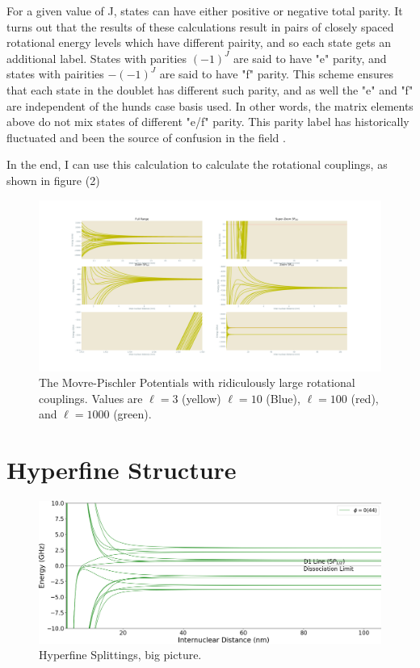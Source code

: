 \documentclass[prl, longbibliography]{revtex4-2}
\begin{document}
For a given value of J, states can have either positive or negative total parity. It turns out that the results of these calculations result in pairs of closely spaced rotational energy levels which have different pairity, and so each state gets an additional label. States with parities $(-1)^J$ are said to have "e" parity, and states with pairities $-(-1)^J$ are said to have "f" parity. This scheme ensures that each state in the doublet has different such parity, and as well the "e" and "f" are independent of the hunds case basis used. In other words, the matrix elements above do not mix states of different "e/f" parity. This parity label has historically fluctuated and been the source of confusion in the field \cite{hornkohl_parity_2017,brown_labeling_1975}.

In the end, I can use this calculation to calculate the rotational couplings, as shown in figure (2)
\begin{figure}
  \centering
    \includegraphics[width=\textwidth]{Movre-Pischler-Super-Rotating}
    \caption{The Movre-Pischler Potentials with ridiculously large rotational couplings. Values are $\ell=3$ (yellow) $\ell=10$ (Blue), $\ell=100$ (red), and $\ell=1000$ (green). }
\end{figure}

\section{Hyperfine Structure} 

\begin{figure}
  \centering
    \includegraphics[width=\textwidth]{Hyperfine_Splitting_Big_Picture}
    \caption{Hyperfine Splittings, big picture. }
\end{figure}
\end{document}
